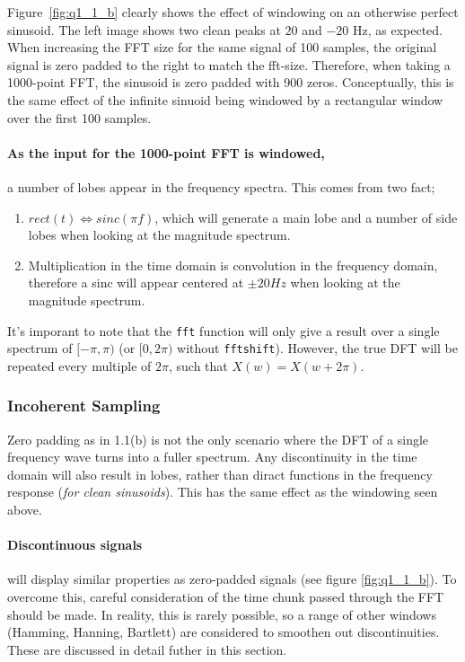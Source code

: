 \documentclass[main.tex]{subfiles}
\begin{document}
Figure~\ref{fig:q1_1_b} clearly shows the effect of windowing on an otherwise perfect sinusoid. The left image shows two clean peaks at $20$ and $-20$ Hz, as expected. When increasing the FFT size for the same signal of 100 samples, the original signal is zero padded to the right to match the fft-size. Therefore, when taking a 1000-point FFT, the sinusoid is zero padded with 900 zeros. Conceptually, this is the same effect of the infinite sinuoid being windowed by a rectangular window over the first 100 samples.

\paragraph{As the input for the 1000-point FFT is windowed,} a number of lobes appear in the frequency spectra. This comes from two fact; 
\begin{enumerate}
	\item $rect(t) \Leftrightarrow sinc(\pi f)$, which will generate a main lobe and a number of side lobes when looking at the magnitude spectrum.
	\item Multiplication in the time domain is convolution in the frequency domain, therefore a sinc will appear centered at $\pm 20Hz$ when looking at the magnitude spectrum.
\end{enumerate}

It's imporant to note that the {\tt fft} function will only give a result over a single spectrum of $[-\pi,\pi)$ (or $[0, 2\pi)$ without {\tt fftshift}). However, the true DFT will be repeated every multiple of $2\pi$, such that $X(w) = X(w+2\pi)$.

\subsubsection{Incoherent Sampling}

Zero padding as in 1.1(b) is not the only scenario where the DFT of a single frequency wave turns into a fuller spectrum. Any discontinuity in the time domain will also result in lobes, rather than diract functions in the frequency response (\textit{for clean sinusoids}). This has the same effect as the windowing seen above. 

\paragraph{Discontinuous signals} will display similar properties as zero-padded signals (see figure \ref{fig:q1_1_b}). To overcome this, careful consideration of the time chunk passed through the FFT should be made. In reality, this is rarely possible, so a range of other windows (Hamming, Hanning, Bartlett) are considered to smoothen out discontinuities. These are discussed in detail futher in this section.
\end{document}
